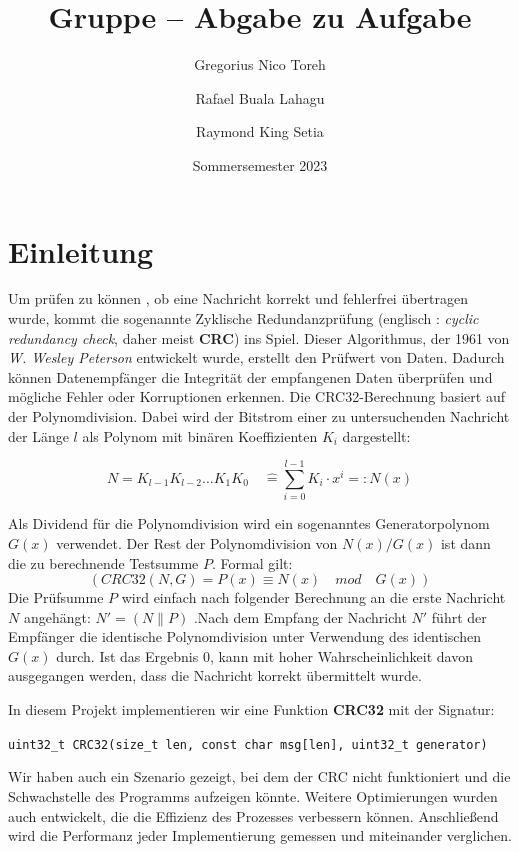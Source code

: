 \documentclass[course=erap]{aspdoc}
\author{Gregorius Nico Toreh \and Rafael Buala Lahagu \and Raymond King Setia}
\date{Sommersemester 2023} %
\title{Gruppe \theGroup{} -- Abgabe zu Aufgabe \theNumber}
\begin{document}
\maketitle

\section{Einleitung}

    Um prüfen zu können , ob eine Nachricht korrekt und fehlerfrei übertragen wurde, kommt die sogenannte Zyklische Redundanzprüfung (englisch :  \textit{cyclic redundancy check}, daher meist \textbf{CRC}) ins Spiel. Dieser Algorithmus, der 1961 von \textit{W. Wesley Peterson} entwickelt wurde, erstellt den Prüfwert von Daten. Dadurch können Datenempfänger die Integrität der empfangenen Daten überprüfen und mögliche Fehler oder Korruptionen erkennen. Die CRC32-Berechnung basiert auf der Polynomdivision. Dabei wird der Bitstrom einer zu untersuchenden Nachricht der Länge $l$ als Polynom mit binären Koeffizienten $K_i$ dargestellt:

\[N = K_{l-1} K_{l-2} \dots K_1 K_0 \quad \hat{=} \sum_{i=0}^{l-1} K_i \cdot x^{i} =: N(x) \]

Als Dividend für die Polynomdivision wird ein sogenanntes Generatorpolynom $G(x)$ verwendet. Der Rest der Polynomdivision von
$N(x)/G(x)$ ist dann die zu berechnende Testsumme $P$. Formal gilt: 
\[(CRC32(N,G) = P(x) \equiv N(x) \quad mod \quad G(x))\]
Die Prüfsumme $P$ wird einfach nach folgender Berechnung an die erste Nachricht $N$ angehängt: $N' =(N \parallel P)$
.Nach dem Empfang der Nachricht $N'$ führt der Empfänger die identische Polynomdivision unter Verwendung des identischen $G(x)$ durch. Ist das Ergebnis 0, kann mit hoher Wahrscheinlichkeit davon ausgegangen werden, dass die Nachricht korrekt übermittelt wurde.

In diesem Projekt implementieren wir eine Funktion \textbf{CRC32} mit der Signatur:
\begin{center}
\texttt{uint32\_t CRC32(size\_t len, const char msg[len], uint32\_t generator)}
\end{center} 

Wir haben auch ein Szenario gezeigt, bei dem der CRC nicht funktioniert und die Schwachstelle des Programms aufzeigen könnte. Weitere Optimierungen wurden auch entwickelt, die die Effizienz des Prozesses verbessern können. Anschließend wird die Performanz jeder Implementierung gemessen und miteinander verglichen.
\end{document}
